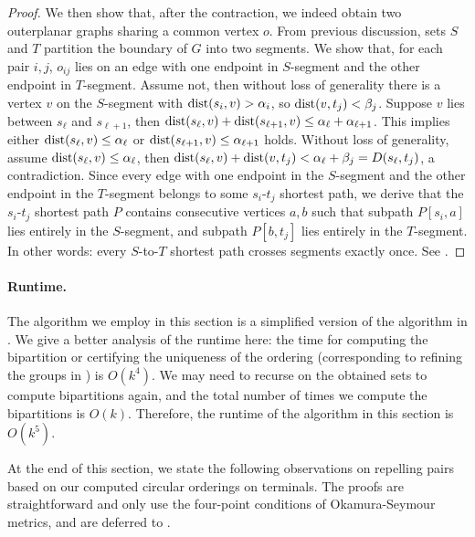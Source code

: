 \documentclass[11pt]{article}
\newcommand{\dist}{\textnormal{dist}}
\begin{document}
\begin{proof}
We then show that, after the contraction, we indeed obtain two outerplanar graphs sharing a common vertex $o$.
From previous discussion, sets $S$ and $T$ partition the boundary of $G$  into two segments. 
We show that, for each pair $i,j$, $o_{ij}$ lies on an edge with one endpoint in $S$-segment and the other endpoint in $T$-segment.
Assume not, then without loss of generality there is a vertex $v$ on the $S$-segment with $\dist(s_i,v) > \alpha_i$, so $\dist(v,t_j) < \beta_j$. Suppose $v$ lies between $s_{\ell}$ and $s_{\ell+1}$, then $\dist(s_{\ell},v)+\dist(s_{\ell+1},v)\le \alpha_{\ell}+\alpha_{\ell+1}$. This implies either $\dist(s_{\ell},v) \le \alpha_{\ell}$ or $\dist(s_{\ell+1},v) \le \alpha_{\ell+1}$ holds. Without loss of generality, assume $\dist(s_{\ell},v) \le \alpha_{\ell}$, then $\dist(s_{\ell},v)+\dist(v,t_j) < \alpha_{\ell}+\beta_j=D(s_{\ell},t_j)$, a contradiction. 
Since every edge with one endpoint in the $S$-segment and the other endpoint in the $T$-segment belongs to some $s_i$-$t_j$ shortest path, we derive that
the $s_i$-$t_j$ shortest path $P$ contains consecutive vertices $a,b$ such that subpath $P[s_i,a]$ lies entirely in the $S$-segment, and subpath $P[b,t_j]$ lies entirely in the $T$-segment. In other words: every $S$-to-$T$ shortest path crosses segments exactly once. See .
\end{proof}




\paragraph{Runtime.} The algorithm we employ in this section is a simplified version of the algorithm in \cite{chen2025path}. We give a better analysis of the runtime here: the time for computing the bipartition or certifying the uniqueness of the ordering (corresponding to refining the groups in \cite{chen2025path}) is $O(k^4)$. We may need to recurse on the obtained sets to compute bipartitions again, and the total number of times we compute the bipartitions is $O(k)$. Therefore, the runtime of the algorithm in this section is $O(k^5)$.





At the end of this section, we state the following observations on repelling pairs based on our computed circular orderings on terminals. The proofs are straightforward and only use the four-point conditions of Okamura-Seymour metrics, and are deferred to .
\end{document}
